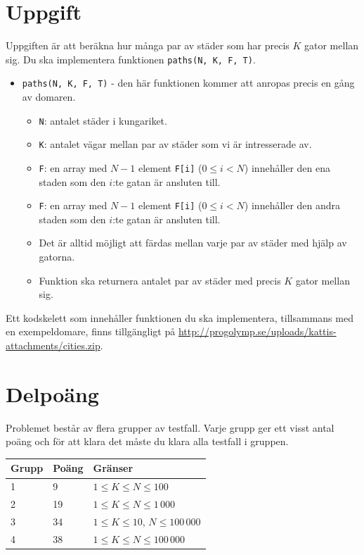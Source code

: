 \section*{Uppgift}
Uppgiften är att beräkna hur många par av städer som har precis $K$ gator mellan sig. Du ska implementera funktionen \texttt{paths(N, K, F, T)}.
\begin{itemize}
  \item \texttt{paths(N, K, F, T)} - den här funktionen kommer att anropas precis en gång av domaren.
  \begin{itemize}
    \item \texttt{N}: antalet städer i kungariket.
    \item \texttt{K}: antalet vägar mellan par av städer som vi är intresserade av.
    \item \texttt{F}: en array med $N-1$ element \texttt{F[i]} ($0 \le i < N$) innehåller den ena staden som den $i$:te gatan är ansluten till.
    \item \texttt{F}: en array med $N-1$ element \texttt{F[i]} ($0 \le i < N$) innehåller den andra staden som den $i$:te gatan är ansluten till.
    \item Det är alltid möjligt att färdas mellan varje par av städer med hjälp av gatorna.
    \item Funktion ska returnera antalet par av städer med precis $K$ gator mellan sig.
  \end{itemize}
\end{itemize}

Ett kodskelett som innehåller funktionen du ska implementera, tillsammans med en exempeldomare, finns tillgängligt på
\url{http://progolymp.se/uploads/kattis-attachments/cities.zip}.

\section*{Delpoäng}
Problemet består av flera grupper av testfall. Varje grupp ger ett visst antal poäng och för att klara det måste du klara alla testfall i gruppen.

\begin{tabular}{|l|l|l|}
  \hline
  \textbf{Grupp} & \textbf{Poäng} & \textbf{Gränser} \\ \hline
  1 & 9 & $1 \le K \le N \le 100$ \\ \hline
  2 & 19 & $1 \le K \le N \le 1\,000$ \\ \hline
  3 & 34 & $1 \le K \le 10$, $N \le 100\,000$ \\ \hline
  4 & 38 & $1 \le K \le N \le 100\,000$ \\ \hline
\end{tabular}

